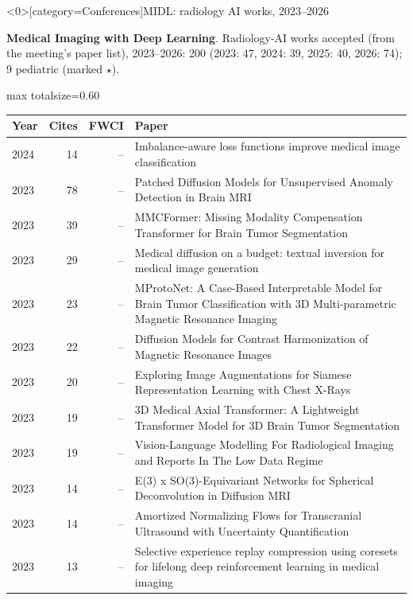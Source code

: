 \documentclass[aspectratio=169]{beamer}
\renewcommand{\arraystretch}{1.08}
\begin{document}
\begin{frame}<0>[category=Conferences]{MIDL: radiology AI works, 2023--2026}
{\scriptsize \textbf{Medical Imaging with Deep Learning}. Radiology-AI works accepted (from the meeting's paper list), 2023--2026: 200 (2023: 47, 2024: 39, 2025: 40, 2026: 74); 9 pediatric (marked $\star$).\par}\vspace{2pt}
\tiny
\begin{adjustbox}{max totalsize={\textwidth}{0.60\textheight}}
\renewcommand{\arraystretch}{1.2}
\begin{tabular}{|l|r|r|>{\raggedright\arraybackslash}p{}|}
\hline \textbf{Year} & \textbf{Cites} & \textbf{FWCI} & \textbf{Paper} \\ \hline
2024 & 14 & -- & Imbalance-aware loss functions improve medical image classification \\ \hline
2023 & 78 & -- & Patched Diffusion Models for Unsupervised Anomaly Detection in Brain MRI \\ \hline
2023 & 39 & -- & MMCFormer: Missing Modality Compensation Transformer for Brain Tumor Segmentation \\ \hline
2023 & 29 & -- & Medical diffusion on a budget: textual inversion for medical image generation \\ \hline
2023 & 23 & -- & MProtoNet: A Case-Based Interpretable Model for Brain Tumor Classification with 3D Multi-parametric Magnetic Resonance Imaging \\ \hline
2023 & 22 & -- & Diffusion Models for Contrast Harmonization of Magnetic Resonance Images \\ \hline
2023 & 20 & -- & Exploring Image Augmentations for Siamese Representation Learning with Chest X-Rays \\ \hline
2023 & 19 & -- & 3D Medical Axial Transformer: A Lightweight Transformer Model for 3D Brain Tumor Segmentation \\ \hline
2023 & 19 & -- & Vision-Language Modelling For Radiological Imaging and Reports In The Low Data Regime \\ \hline
2023 & 14 & -- & E(3) x SO(3)-Equivariant Networks for Spherical Deconvolution in Diffusion MRI \\ \hline
2023 & 14 & -- & Amortized Normalizing Flows for Transcranial Ultrasound with Uncertainty Quantification \\ \hline
2023 & 13 & -- & Selective experience replay compression using coresets for lifelong deep reinforcement learning in medical imaging \\ \hline
\end{tabular}
\end{adjustbox}
\\[2pt]
\end{frame}
\end{document}
